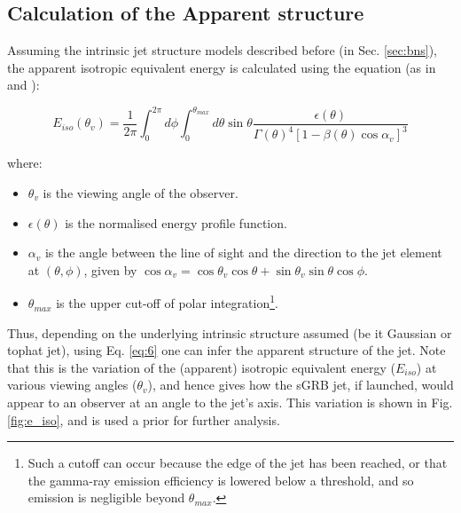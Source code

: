     \subsection{Calculation of the Apparent structure}

    Assuming the intrinsic jet structure models described before (in Sec.
    \ref{sec:bns}), the apparent isotropic equivalent energy is calculated using the
    equation (as in \cite{salafia_2015} and
    \cite{biscoveanu_2020}):

     \begin{equation}
         \label{eq:6}
         E_{iso}(\theta_v) =
             \dfrac{1}{2\pi}
             \int_{0}^{2\pi} d\phi \int_{0}^{\theta_{max}} d\theta
             \sin \theta
             \dfrac{\epsilon(\theta)}{\Gamma(\theta)^4
             [1 - \beta(\theta) \cos \alpha_v]^3}
     \end{equation}

    where:
    \begin{itemize}

        \item $\theta_v$ is the viewing angle of the observer.

        \item $\epsilon(\theta)$ is the normalised energy profile function.

        \item $\alpha_v$ is the angle between the line of sight and the direction to the
            jet element at $(\theta, \phi)$, given by $\cos \alpha_v = \cos \theta_v
            \cos \theta + \sin \theta_v \sin \theta \cos \phi$.

        \item $\theta_{max}$ is the upper cut-off of polar integration\footnote
            {
                Such a cutoff can occur because the edge of the jet has been reached, or
                that the gamma-ray emission efficiency is lowered below a threshold, and
                so emission is negligible beyond $\theta_{max}$.
            }.

    \end{itemize}

    Thus, depending on the underlying intrinsic structure assumed (be it Gaussian or
    tophat jet), using Eq. \ref{eq:6} one can infer the apparent structure of the jet.
    Note that this is the variation of the (apparent) isotropic equivalent energy
    ($E_{iso}$) at various viewing angles ($\theta_v$), and hence gives how the sGRB
    jet, if launched, would appear to an observer at an angle to the jet's axis. This
    variation is shown in Fig. \ref{fig:e_iso}, and is used a prior for further
    analysis.

